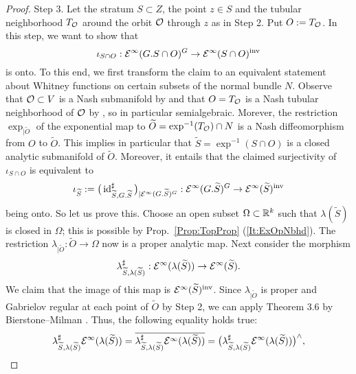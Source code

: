\begin{proof}
{Step 3.} Let the stratum $S \subset Z$, the point $z \in S$ and the tubular neighborhood $T_{\mathcal{O}}$ 
around the orbit $\mathcal{O}$ through $z$ as in Step 2. Put $O:=T_{\mathcal{O}}$. 
In this step, we want to show that
\[
 \iota_{S\cap O}: \mathcal{E}^\infty(G.S\cap O)^G\to \mathcal{E}^\infty(S\cap O)^\textup{inv} 
\] 
is onto. To this end, we first transform the claim to an equivalent statement about 
Whitney functions on certain subsets of the normal bundle $N$. 
Observe that $\mathcal{O}\subset V$ is a Nash submanifold by \cite[A.~10]{BryIKGNO}
and that $O = T_{\mathcal{O}}$ is a Nash tubular neighborhood 
of $\mathcal{O}$ by \cite[Cor.~8.9.5]{BocCosRoyRAG}, so in particular semialgebraic. 
Morever, the restriction 
$\exp_{|\widetilde O}$ of the exponential map to $\widetilde O = \exp^{-1} (T_{\mathcal{O}}) \cap N$ 
is a Nash diffeomorphism from $O$ to  $\widetilde O$. 
This implies in particular that $\widetilde S = \exp^{-1} (S \cap O) $ is a closed
analytic submanifold of $\widetilde O$. Moreover, it entails that the claimed surjectivity of 
$\iota_{S\cap O}$ is equivalent to 
\[
  \iota_{\widetilde S} := \big( \operatorname{id}^{\sharp}_{\widetilde S, G.\widetilde{S}}\big)_{|\mathcal{E}^\infty(G.\widetilde{S})^G} : 
  \mathcal{E}^\infty(G.\widetilde{S})^G\to \mathcal{E}^\infty(\widetilde S)^\textup{inv} 
\]
being onto. So let us prove this. Choose an open subset $\Omega \subset \mathbb{R}^k$ such that 
$\lambda (\widetilde S)$ is closed in $\Omega$; this is possible by Prop.~\ref{Prop:TopProp} (\ref{It:ExOpNbhd}). 
The restriction $\lambda_{|\widetilde O} :\widetilde O \rightarrow \Omega$ now is a proper analytic map.  
Next consider the morphism 
\begin{equation}
\label{eq:lambdasharp}
  \lambda_{\widetilde S, \lambda(\widetilde S)}^{\sharp} : \mathcal{E}^\infty ( \lambda(\widetilde S) ) \rightarrow 
  \mathcal{E}^\infty (\widetilde S).
\end{equation}
We claim that the image of this map is $\mathcal{E}^\infty (\widetilde S)^\textup{inv}$.
Since $\lambda_{|\widetilde O}$ is proper and Gabrielov regular at each point of $\widetilde O$ by Step 2, 
we can apply Theorem 3.6  by Bierstone--Milman \cite{BieMilCDF}. Thus, the following equality holds true:
\begin{equation}
  \label{Eq:ImEquiv}
  \lambda_{\widetilde S, \lambda(\widetilde S)}^{\sharp} \mathcal{E}^\infty (\lambda(\widetilde S)) =
  \overline{\lambda_{\widetilde S, \lambda(\widetilde S)}^{\sharp} \mathcal{E}^\infty (\lambda(\widetilde S))}=
  \big( \lambda_{\widetilde S, \lambda(\widetilde S)}^{\sharp} \mathcal{E}^\infty (\lambda(\widetilde S))\big)^\wedge ,
\end{equation}

\end{proof}
